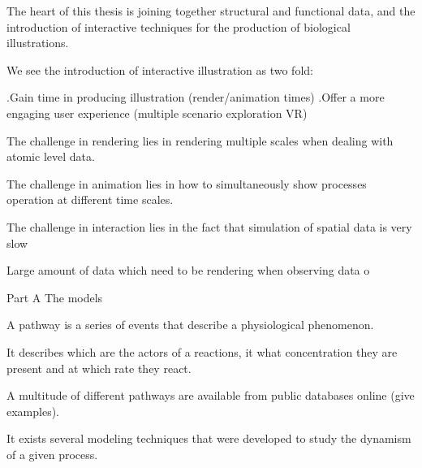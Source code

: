 The heart of this thesis is joining together structural and functional data, and the introduction of interactive techniques for the production of biological illustrations.

We see the introduction of interactive illustration as two fold:

.Gain time in producing illustration (render/animation times)
.Offer a more engaging user experience (multiple scenario exploration VR)

The challenge in rendering lies in rendering multiple scales when dealing with atomic level data.

The challenge in animation lies in how to simultaneously show processes operation at different time scales.

The challenge in interaction lies in the fact that simulation of spatial data is very slow

Large amount of data which need to be rendering when observing data o






%
%
%
%
% 
%
%
%
%


Part A The models

A pathway is a series of events that describe a physiological phenomenon.

It describes which are the actors of a reactions, it what concentration they are present and at which rate they react.

A multitude of different pathways are available from public databases online (give examples).


It exists several modeling techniques that were developed to study the dynamism of a given process.

